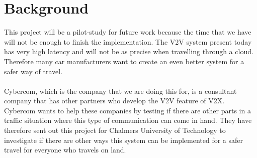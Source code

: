 \section{Background}
This project will be a pilot-study for future work because the time that we have will not be enough to finish the implementation. The V2V system present today has very high latency and will not be as precise when travelling through a cloud. Therefore many car manufacturers want to create an even better system for a safer way of travel.
\paragraph{}
Cybercom, which is the company that we are doing this for, is a consultant company that has other partners who develop the V2V feature of V2X. Cybercom wants to help these companies by testing if there are other parts in a traffic situation where this type of communication can come in hand.
They have therefore sent out this project for Chalmers University of Technology to investigate if there are other ways this system can be implemented for a safer travel for everyone who travels on land.